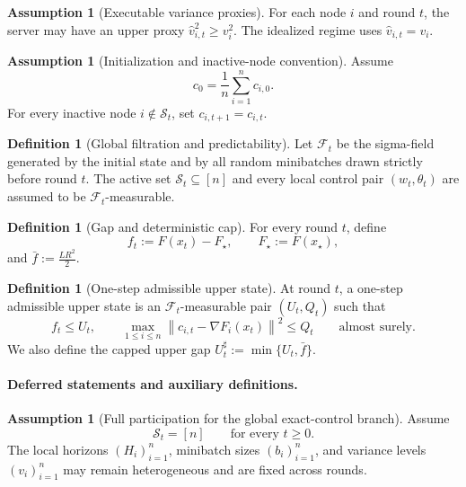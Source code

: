 \documentclass{article}
\theoremstyle{definition}
\newtheorem{definition}[theorem]{Definition}
\newtheorem{assumption}[theorem]{Assumption}
\newcommand{\cF}{\mathcal F}
\newcommand{\norm}[1]{\left\lVert #1\right\rVert}
\begin{document}
\begin{assumption}[Executable variance proxies]
For each node $i$ and round $t$, the server may have an upper proxy $\widehat v_{i,t}^2\ge v_i^2$.
The idealized regime uses $\widehat v_{i,t}=v_i$.
\end{assumption}

\begin{assumption}[Initialization and inactive-node convention]
\label{ass:init}
Assume
\begin{equation}
c_0=\frac1n\sum_{i=1}^n c_{i,0}.
\label{eq:init}
\end{equation}
For every inactive node $i\notin \mathcal S_t$, set $c_{i,t+1}=c_{i,t}$.
\end{assumption}

\begin{definition}[Global filtration and predictability]
Let $\cF_t$ be the sigma-field generated by the initial state and by all random
minibatches drawn strictly before round $t$. The active set
$\mathcal S_t\subseteq[n]$ and every local control pair $(w_t,\theta_t)$ are
assumed to be $\cF_t$-measurable.
\end{definition}

\begin{definition}[Gap and deterministic cap]
For every round $t$, define
\[
f_t:=F(x_t)-F_\star,
\qquad
F_\star:=F(x_\star),\]
and $\bar f:=\frac{LR^2}{2}$.
\end{definition}

\begin{definition}[One-step admissible upper state]
At round $t$, a one-step admissible upper state is an $\cF_t$-measurable pair
$(U_t,Q_t)$ such that
\[
f_t\le U_t,
\qquad
\max_{1\le i\le n}\norm{c_{i,t}-\nabla F_i(x_t)}^2\le Q_t
\qquad\text{almost surely.}\]
We also define the capped upper gap $U_t^\sharp:=\min\{U_t,\bar f\}$.
\end{definition}

\paragraph{Deferred statements and auxiliary definitions.}

\begin{assumption}[Full participation for the global exact-control branch]
\label{ass:full-global}
Assume
\[
\mathcal S_t=[n]
\qquad
\text{for every }t\ge 0.
\]
The local horizons $(H_i)_{i=1}^n$, minibatch sizes $(b_i)_{i=1}^n$, and
variance levels $(v_i)_{i=1}^n$ may remain heterogeneous and are fixed across
rounds.
\end{assumption}
\end{document}
